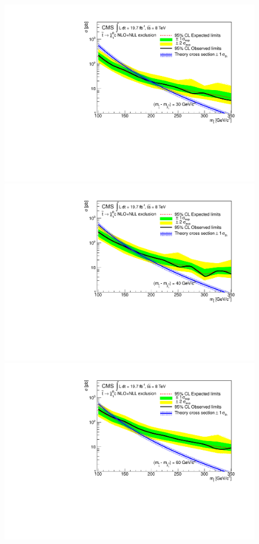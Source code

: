 \begin{figure}[!Hhtb]
\begin{center}
  \includegraphics[scale=0.39]{Figures/sus13009/limits//Limit30.pdf}
  \includegraphics[scale=0.39]{Figures/sus13009/limits//Limit40.pdf}
  \includegraphics[scale=0.39]{Figures/sus13009/limits//Limit60.pdf}

\end{center}
\end{figure}
